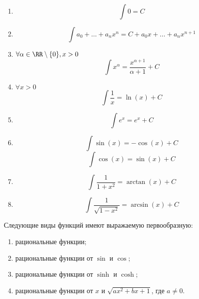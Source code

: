 \documentclass[12pt,a4paper]{article}
\begin{document}
    \begin{lemma}\ 
        \begin{multicols}{2}
            \begin{enumerate}
                \item \[\int 0 = C\]
                \item \[\int a_0 + \dots + a_n x^n = C + a_0 x + \dots + a_n x^{n+1} \]
                \item $\forall \alpha \in \RR \setminus \{0\}, x > 0$
                    \[\int x^\alpha = \frac{x^{\alpha + 1}}{\alpha + 1} + C\]
                \item $\forall x > 0$
                    \[\int \frac{1}{x} = \ln(x) + C\]
                \item \[\int e^x = e^x + C\]
                \item \[\int \sin(x) = -\cos(x) + C\] \[\int \cos(x) = \sin(x) + C\]
                \item \[\int \frac{1}{1+x^2} = \arctan(x) + C\]
                \item \[\int \frac{1}{\sqrt{1-x^2}} = \arcsin(x) + C\]
            \end{enumerate}
        \end{multicols}
    \end{lemma}

    \begin{theorem}
        Следующие виды функций имеют выражаемую первообразную:
        \begin{multicols}{2}
            \begin{enumerate}
                \item рациональные функции;
                \item рациональные функции от $\sin$ и $\cos$;
                \item рациональные функции от $\sinh$ и $\cosh$;
                \item рациональные функции от $x$ и $\sqrt{ax^2 + bx + 1}$, где $a \neq 0$.
            \end{enumerate}
        \end{multicols}
    \end{theorem}
\end{document}
